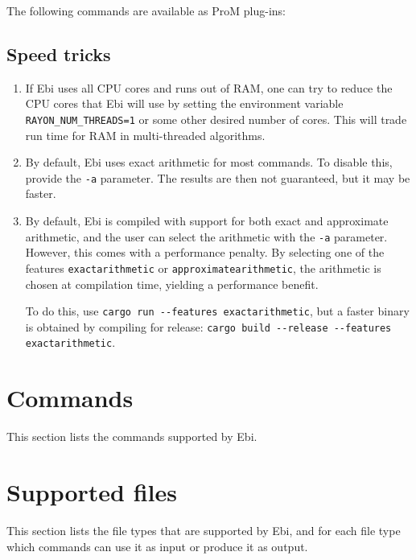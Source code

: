 \documentclass{article}
\begin{document}
		The following commands are available as ProM plug-ins:
		\promcommands
	
	\subsection{Speed tricks}
	\label{sec:speedtricks}
		\begin{enumerate}
			\item
			\label{speedtrick:multithreaded}
			If Ebi uses all CPU cores and runs out of RAM, one can try to reduce the CPU cores that Ebi will use by setting the environment variable \verb!RAYON_NUM_THREADS=1! or some other desired number of cores.
			This will trade run time for RAM in multi-threaded algorithms.

			\item By default, Ebi uses exact arithmetic for most commands.
			To disable this, provide the \verb=-a= parameter.
			The results are then not guaranteed, but it may be faster.

   			\item By default, Ebi is compiled with support for both exact and approximate arithmetic, and the user can select the arithmetic with the \verb=-a= parameter.
            However, this comes with a performance penalty.
            By selecting one of the features \verb=exactarithmetic= or \verb=approximatearithmetic=, the arithmetic is chosen at compilation time, yielding a performance benefit.

            To do this, use \verb=cargo run --features exactarithmetic=, but a faster binary is obtained by compiling for release: \verb=cargo build --release --features exactarithmetic=.
		\end{enumerate}

\section{Commands}
\label{sec:commands}

	This section lists the commands supported by Ebi.

    \ebicommands

\clearpage
\section{Supported files}
\label{sec:filehandlers}
	This section lists the file types that are supported by Ebi, and for each file type which commands can use it as input or produce it as output.
	
\end{document}
